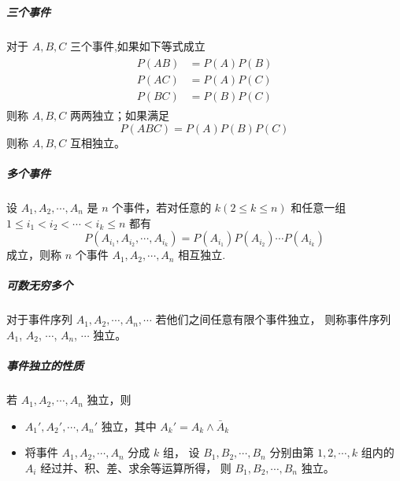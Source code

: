 \subparagraph{三个事件} 对于 $A,B,C$ 三个事件,如果如下等式成立
\begin{align}
    \begin{split}
        P(AB) & = P(A)P(B) \\
        P(AC) & = P(A)P(C) \\
        P(BC) & = P(B)P(C) 
    \end{split}
\end{align}
则称 $A,B,C$ 两两独立；如果满足
\begin{equation}
    P(ABC) = P(A)P(B)P(C)
\end{equation}
则称 $A,B,C$ 互相独立。

\subparagraph{多个事件} 设 $A_1,A_2,\cdots,A_n$ 是 $n$ 个事件，若对任意的 $k(2 \leqslant k \leqslant n)$
和任意一组 $ 1 \leqslant i_1 < i_2 < \cdots < i_k \leqslant n $ 都有
\begin{equation}
    P(A_{i_1}, A_{i_2}, \cdots, A_{i_k}) = P(A_{i_1})P(A_{i_2})\cdots P(A_{i_k})
\end{equation}
成立，则称 $n$ 个事件 $A_1,A_2,\cdots,A_n$ 相互独立.

\subparagraph{可数无穷多个} 对于事件序列 $A_1,A_2,\cdots,A_n,\cdots$ 若他们之间任意有限个事件独立，
则称事件序列 $A_1$, $A_2$, $\cdots$, $A_n$, $\cdots$ 独立。

\subparagraph{事件独立的性质} 若 $A_1,A_2,\cdots,A_n$ 独立，则
\begin{itemize}[leftmargin=\subparitemindent]
    \item $A_1',A_2',\cdots,A_n'$ 独立，其中 $A_k' = A_k \wedge \bar{A}_k $
    \item 将事件 $A_1,A_2,\cdots,A_n$ 分成 $k$ 组，
    设 $B_1,B_2,\cdots,B_n$ 分别由第 $1,2,\cdots,k$ 组内的 $A_i$ 经过并、积、差、求余等运算所得，
    则 $B_1,B_2,\cdots,B_n$ 独立。
\end{itemize}